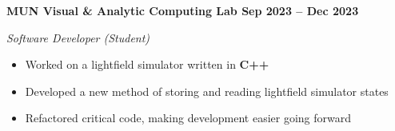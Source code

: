 \textbf{MUN Visual \& Analytic Computing Lab \hfill Sep 2023 -- Dec 2023}\par

\textit{Software Developer (Student)}
\begin{itemize}
	\item Worked on a lightfield simulator written in \textbf{C++}
    \item Developed a new method of storing and reading lightfield simulator states
    \item Refactored critical code, making development easier going forward
\end{itemize}\par
